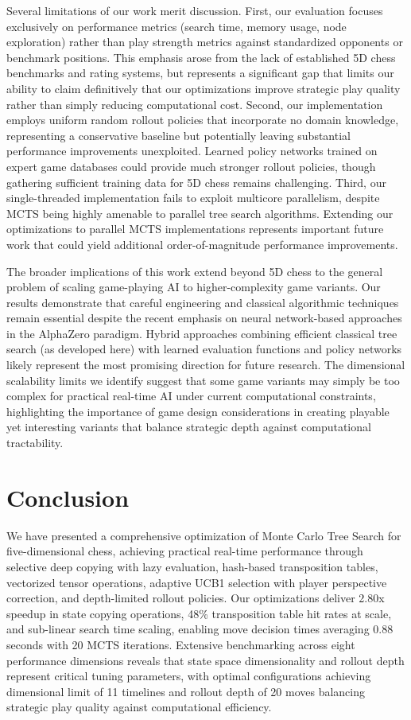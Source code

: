 \documentclass{article}
\begin{document}
Several limitations of our work merit discussion. First, our evaluation focuses exclusively on performance metrics (search time, memory usage, node exploration) rather than play strength metrics against standardized opponents or benchmark positions. This emphasis arose from the lack of established 5D chess benchmarks and rating systems, but represents a significant gap that limits our ability to claim definitively that our optimizations improve strategic play quality rather than simply reducing computational cost. Second, our implementation employs uniform random rollout policies that incorporate no domain knowledge, representing a conservative baseline but potentially leaving substantial performance improvements unexploited. Learned policy networks trained on expert game databases could provide much stronger rollout policies, though gathering sufficient training data for 5D chess remains challenging. Third, our single-threaded implementation fails to exploit multicore parallelism, despite MCTS being highly amenable to parallel tree search algorithms. Extending our optimizations to parallel MCTS implementations represents important future work that could yield additional order-of-magnitude performance improvements.

The broader implications of this work extend beyond 5D chess to the general problem of scaling game-playing AI to higher-complexity game variants. Our results demonstrate that careful engineering and classical algorithmic techniques remain essential despite the recent emphasis on neural network-based approaches in the AlphaZero paradigm. Hybrid approaches combining efficient classical tree search (as developed here) with learned evaluation functions and policy networks likely represent the most promising direction for future research. The dimensional scalability limits we identify suggest that some game variants may simply be too complex for practical real-time AI under current computational constraints, highlighting the importance of game design considerations in creating playable yet interesting variants that balance strategic depth against computational tractability.

\section{Conclusion}

We have presented a comprehensive optimization of Monte Carlo Tree Search for five-dimensional chess, achieving practical real-time performance through selective deep copying with lazy evaluation, hash-based transposition tables, vectorized tensor operations, adaptive UCB1 selection with player perspective correction, and depth-limited rollout policies. Our optimizations deliver 2.80x speedup in state copying operations, 48\% transposition table hit rates at scale, and sub-linear search time scaling, enabling move decision times averaging 0.88 seconds with 20 MCTS iterations. Extensive benchmarking across eight performance dimensions reveals that state space dimensionality and rollout depth represent critical tuning parameters, with optimal configurations achieving dimensional limit of 11 timelines and rollout depth of 20 moves balancing strategic play quality against computational efficiency.
\end{document}
